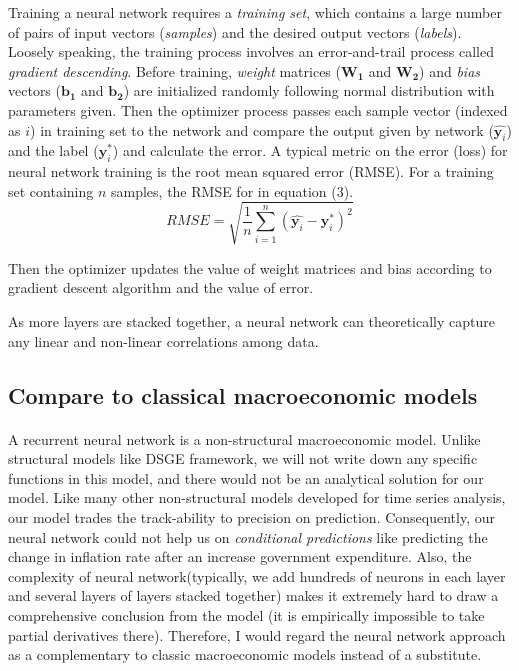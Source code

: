 \documentclass[11pt]{article}
\begin{document}
Training a neural network requires a \emph{training set}, which contains a large number of pairs of input vectors (\emph{samples}) and the desired output vectors (\emph{labels}). Loosely speaking, the training process involves an error-and-trail process called \emph{gradient descending}. Before training, \emph{weight} matrices ($\pmb{W_1}$ and $\pmb{W_2}$) and \emph{bias} vectors ($\pmb{b_1}$ and $\pmb{b_2}$) are initialized randomly following normal distribution with parameters given. Then the optimizer process passes each sample vector (indexed as $i$) in training set to the network and compare the output given by network ($\hat{\pmb{y}_i}$) and the label ($\pmb{y}_i^*$) and calculate the error. A typical metric on the error (loss) for neural network training is the root mean squared error (RMSE). For a training set containing $n$ samples, the RMSE for  in equation (3).
    \begin{equation}
        RMSE = \sqrt{\frac{1}{n} \sum_{i=1}^n (\hat{\pmb{y}_i} - \pmb{y}_i^*)^2}
    \end{equation}

Then the optimizer updates the value of weight matrices and bias according to gradient descent algorithm and the value of error.

As more layers are stacked together, a neural network can theoretically capture any linear and non-linear correlations among data.

\subsection{Compare to classical macroeconomic models}
\paragraph{} A recurrent neural network is a non-structural macroeconomic model. Unlike structural models like DSGE framework, we will not write down any specific functions in this model, and there would not be an analytical solution for our model. Like many other non-structural models developed for time series analysis, our model trades the track-ability to precision on prediction. Consequently, our neural network could not help us on \emph{conditional predictions} like predicting the change in inflation rate after an increase government expenditure. Also, the complexity of neural network(typically, we add hundreds of neurons in each layer and several layers of layers stacked together) makes it extremely hard to draw a comprehensive conclusion from the model (it is empirically impossible to take partial derivatives there).
Therefore, I would regard the neural network approach as a complementary to classic macroeconomic models instead of a substitute.
\end{document}
